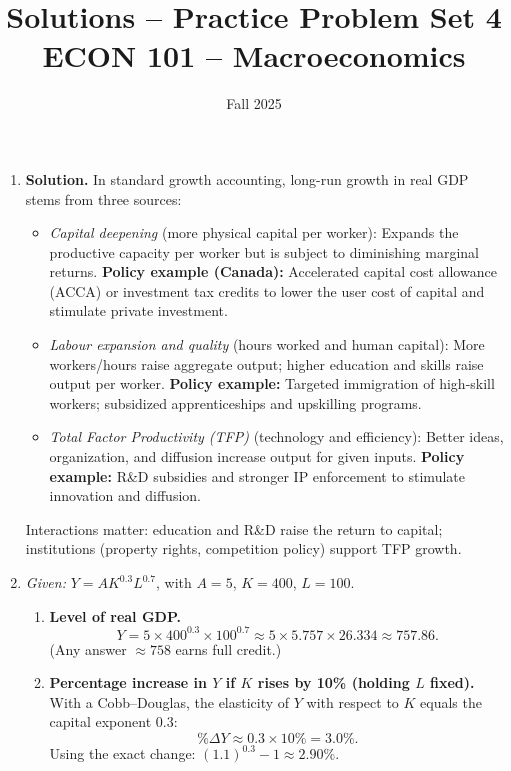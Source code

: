 \documentclass[12pt]{article}
\title{Solutions -- Practice Problem Set 4\\ \vspace{10pt} \large ECON 101 -- Macroeconomics}
\author{}
\date{ \vspace{-30pt} Fall 2025}
\begin{document}
\maketitle


\begin{enumerate}[label=\textbf{\arabic*.}, leftmargin=1.5em]

\item \textbf{Solution.} In standard growth accounting, long-run growth in real GDP stems from three sources:
\begin{itemize}[leftmargin=1.2em]
  \item \emph{Capital deepening} (more physical capital per worker): Expands the productive capacity per worker but is subject to diminishing marginal returns. \textbf{Policy example (Canada):} Accelerated capital cost allowance (ACCA) or investment tax credits to lower the user cost of capital and stimulate private investment.
  \item \emph{Labour expansion and quality} (hours worked and human capital): More workers/hours raise aggregate output; higher education and skills raise output per worker. \textbf{Policy example:} Targeted immigration of high-skill workers; subsidized apprenticeships and upskilling programs.
  \item \emph{Total Factor Productivity (TFP)} (technology and efficiency): Better ideas, organization, and diffusion increase output for given inputs. \textbf{Policy example:} R\&D subsidies and stronger IP enforcement to stimulate innovation and diffusion.
\end{itemize}
Interactions matter: education and R\&D raise the return to capital; institutions (property rights, competition policy) support TFP growth.

\vspace{0.75em}

\item \emph{Given:} $Y = A K^{0.3} L^{0.7}$, with $A=5$, $K=400$, $L=100$.
\begin{enumerate}[label=(\alph*)]
\item \textbf{Level of real GDP.}
\[
Y = 5 \times 400^{0.3} \times 100^{0.7} \approx 5 \times 5.757 \times 26.334 \approx \mathbf{757.86}.
\]
(Any answer $\approx 758$ earns full credit.)

\item \textbf{Percentage increase in $Y$ if $K$ rises by 10\% (holding $L$ fixed).}\\
With a Cobb--Douglas, the elasticity of $Y$ with respect to $K$ equals the capital exponent $0.3$:
\[
\%\Delta Y \approx 0.3 \times 10\% = \mathbf{3.0\%}.
\]
Using the exact change: $(1.1)^{0.3}-1 \approx \mathbf{2.90\%}$.


\end{enumerate}
\end{enumerate}
\end{document}
